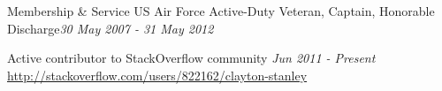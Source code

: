 
\begin{rSection}{Membership \& Service}
US Air Force Active-Duty Veteran, Captain, Honorable Discharge\hfill {\em 30 May 2007 - 31 May 2012}
\item Active contributor to StackOverflow community \hfill {\em Jun 2011 - Present} \\
\url{http://stackoverflow.com/users/822162/clayton-stanley}
\end{rSection}

